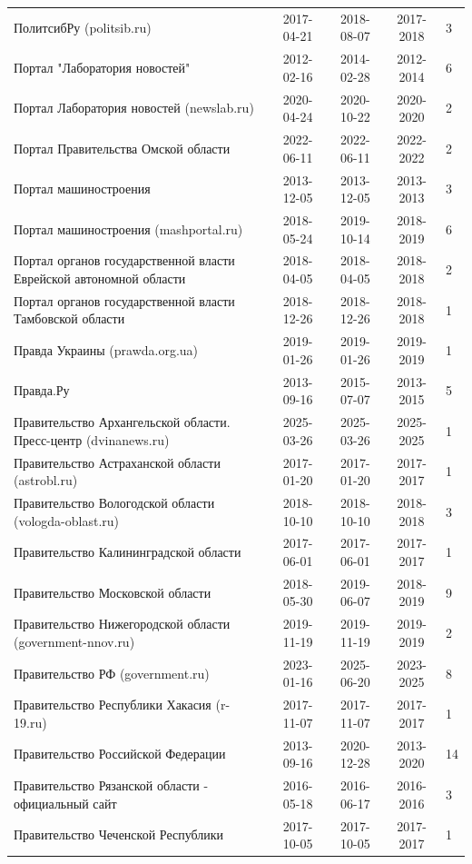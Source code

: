 \begin{longtable}{p{6cm}cccp{2cm}}
ПолитсибРу (politsib.ru) & 2017-04-21 & 2018-08-07 & 2017-2018 & 3\\
Портал "Лаборатория новостей" & 2012-02-16 & 2014-02-28 & 2012-2014 & 6\\
Портал Лаборатория новостей (newslab.ru) & 2020-04-24 & 2020-10-22 & 2020-2020 & 2\\
Портал Правительства Омской области & 2022-06-11 & 2022-06-11 & 2022-2022 & 2\\
Портал машиностроения & 2013-12-05 & 2013-12-05 & 2013-2013 & 3\\
Портал машиностроения (mashportal.ru) & 2018-05-24 & 2019-10-14 & 2018-2019 & 6\\
Портал органов государственной власти Еврейской автономной области & 2018-04-05 & 2018-04-05 & 2018-2018 & 2\\
Портал органов государственной власти Тамбовской области & 2018-12-26 & 2018-12-26 & 2018-2018 & 1\\
Правда Украины (prawda.org.ua) & 2019-01-26 & 2019-01-26 & 2019-2019 & 1\\
Правда.Ру & 2013-09-16 & 2015-07-07 & 2013-2015 & 5\\
Правительство Архангельской области. Пресс-центр (dvinanews.ru) & 2025-03-26 & 2025-03-26 & 2025-2025 & 1\\
Правительство Астраханской области (astrobl.ru) & 2017-01-20 & 2017-01-20 & 2017-2017 & 1\\
Правительство Вологодской области (vologda-oblast.ru) & 2018-10-10 & 2018-10-10 & 2018-2018 & 3\\
Правительство Калининградской области & 2017-06-01 & 2017-06-01 & 2017-2017 & 1\\
Правительство Московской области & 2018-05-30 & 2019-06-07 & 2018-2019 & 9\\
Правительство Нижегородской области (government-nnov.ru) & 2019-11-19 & 2019-11-19 & 2019-2019 & 2\\
Правительство РФ (government.ru) & 2023-01-16 & 2025-06-20 & 2023-2025 & 8\\
Правительство Республики Хакасия (r-19.ru) & 2017-11-07 & 2017-11-07 & 2017-2017 & 1\\
Правительство Российской Федерации & 2013-09-16 & 2020-12-28 & 2013-2020 & 14\\
Правительство Рязанской области - официальный сайт & 2016-05-18 & 2016-06-17 & 2016-2016 & 3\\
Правительство Чеченской Республики & 2017-10-05 & 2017-10-05 & 2017-2017 & 1\\

\end{longtable}
